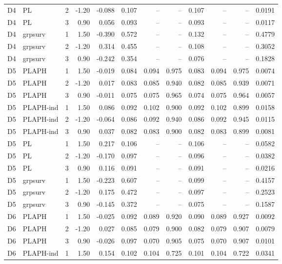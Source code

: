 \begin{longtable}{cllrrrrrrrrr}
D4 & PL & 2 & -1.20 & -0.088 & 0.107 & -- & -- & 0.107 & -- & -- & 0.0191 \\
D4 & PL & 3 & 0.90 & 0.056 & 0.093 & -- & -- & 0.093 & -- & -- & 0.0117 \\
D4 & grpsurv & 1 & 1.50 & -0.390 & 0.572 & -- & -- & 0.132 & -- & -- & 0.4779 \\
D4 & grpsurv & 2 & -1.20 & 0.314 & 0.455 & -- & -- & 0.108 & -- & -- & 0.3052 \\
D4 & grpsurv & 3 & 0.90 & -0.242 & 0.354 & -- & -- & 0.076 & -- & -- & 0.1828 \\
D5 & PLAPH & 1 & 1.50 & -0.019 & 0.084 & 0.094 & 0.975 & 0.083 & 0.094 & 0.975 & 0.0074 \\
D5 & PLAPH & 2 & -1.20 & 0.017 & 0.083 & 0.085 & 0.940 & 0.082 & 0.085 & 0.939 & 0.0071 \\
D5 & PLAPH & 3 & 0.90 & -0.011 & 0.075 & 0.075 & 0.965 & 0.074 & 0.075 & 0.964 & 0.0057 \\
D5 & PLAPH-ind & 1 & 1.50 & 0.086 & 0.092 & 0.102 & 0.900 & 0.092 & 0.102 & 0.899 & 0.0158 \\
D5 & PLAPH-ind & 2 & -1.20 & -0.064 & 0.086 & 0.092 & 0.940 & 0.086 & 0.092 & 0.945 & 0.0115 \\
D5 & PLAPH-ind & 3 & 0.90 & 0.037 & 0.082 & 0.083 & 0.900 & 0.082 & 0.083 & 0.899 & 0.0081 \\
D5 & PL & 1 & 1.50 & 0.217 & 0.106 & -- & -- & 0.106 & -- & -- & 0.0582 \\
D5 & PL & 2 & -1.20 & -0.170 & 0.097 & -- & -- & 0.096 & -- & -- & 0.0382 \\
D5 & PL & 3 & 0.90 & 0.116 & 0.091 & -- & -- & 0.091 & -- & -- & 0.0216 \\
D5 & grpsurv & 1 & 1.50 & -0.223 & 0.607 & -- & -- & 0.099 & -- & -- & 0.4157 \\
D5 & grpsurv & 2 & -1.20 & 0.175 & 0.472 & -- & -- & 0.097 & -- & -- & 0.2523 \\
D5 & grpsurv & 3 & 0.90 & -0.145 & 0.372 & -- & -- & 0.075 & -- & -- & 0.1587 \\
D6 & PLAPH & 1 & 1.50 & -0.025 & 0.092 & 0.089 & 0.920 & 0.090 & 0.089 & 0.927 & 0.0092 \\
D6 & PLAPH & 2 & -1.20 & 0.027 & 0.085 & 0.079 & 0.900 & 0.082 & 0.079 & 0.907 & 0.0079 \\
D6 & PLAPH & 3 & 0.90 & -0.026 & 0.097 & 0.070 & 0.905 & 0.075 & 0.070 & 0.907 & 0.0101 \\
D6 & PLAPH-ind & 1 & 1.50 & 0.154 & 0.102 & 0.104 & 0.725 & 0.101 & 0.104 & 0.722 & 0.0341 \\

\end{longtable}

